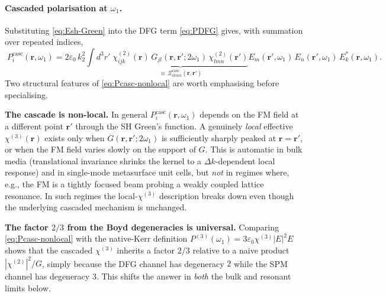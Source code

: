 \documentclass[11pt,a4paper]{article}
\newcommand{\eps}{\varepsilon}
\newcommand{\bvec}[1]{\mathbf{#1}}
\newcommand{\ri}{\bvec{r}}
\newcommand{\chitwo}{\chi^{(2)}}
\newcommand{\chithree}{\chi^{(3)}}
\begin{document}
\paragraph{Cascaded polarisation at $\omega_1$.}
Substituting \eqref{eq:Esh-Green} into the DFG term \eqref{eq:PDFG}
gives, with summation over repeated indices,
\begin{equation}
  \boxed{\;
  P_i^{\text{casc}}(\ri,\omega_1)
  = 2\eps_0\,k_2^2\!\int\!d^3r'\;
    \underbrace{\chitwo_{ijk}(\ri)\,
                G_{jl}(\ri,\ri';2\omega_1)\,
                \chitwo_{lmn}(\ri')}_{\equiv\,\Xi^{\text{casc}}_{ikmn}(\ri,\ri')}
    E_m(\ri',\omega_1)\,E_n(\ri',\omega_1)\,E_k^*(\ri,\omega_1).
  \;}\label{eq:Pcasc-nonlocal}
\end{equation}
Two structural features of \eqref{eq:Pcasc-nonlocal} are worth
emphasising before specialising.

\textbf{The cascade is non-local.}  In general
$P_i^{\text{casc}}(\ri,\omega_1)$ depends on the FM field at a different
point $\ri'$ through the SH Green's function.  A genuinely \emph{local}
effective $\chithree(\ri)$ exists only when $G(\ri,\ri';2\omega_1)$ is
sufficiently sharply peaked at $\ri=\ri'$, or when the FM field varies
slowly on the support of $G$.  This is automatic in bulk media
(translational invariance shrinks the kernel to a
$\Delta k$-dependent local response) and in single-mode metasurface
unit cells, but \emph{not} in regimes where, e.g., the FM is a tightly
focused beam probing a weakly coupled lattice resonance.  In such
regimes the local-$\chithree$ description breaks down even though the
underlying cascaded mechanism is unchanged.

\textbf{The factor $2/3$ from the Boyd degeneracies is universal.}
Comparing \eqref{eq:Pcasc-nonlocal} with the native-Kerr definition
$P^{(3)}(\omega_1)=3\eps_0\chithree|E|^2 E$ shows that the cascaded
$\chithree$ inherits a factor $2/3$ relative to a naive product
$|\chitwo|^2/G$, simply because the DFG channel has degeneracy $2$
while the SPM channel has degeneracy $3$.  This shifts the answer in
\emph{both} the bulk and resonant limits below.
\end{document}
